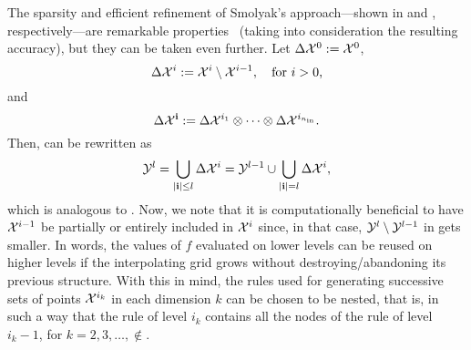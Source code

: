The sparsity and efficient refinement of Smolyak's approach---shown in
 and , respectively---are
remarkable properties \perse\ (taking into consideration the resulting
accuracy), but they can be taken even further. Let $\Delta \mathcal{X}^0 := \mathcal{X}^0$,
\[
  \Delta \mathcal{X}^i := \mathcal{X}^i \setminus \mathcal{X}^{i - 1}, \quad \text{for $i > 0$,}
\]
and
\[
  \Delta \mathcal{X}^{\mathbf{i}} := \Delta \mathcal{X}^{i_1} \otimes \cdots \otimes \Delta \mathcal{X}^{i_{n_\text{in}}}.
\]
Then,  can be rewritten as
\begin{equation} \elab{smolyak-grid-incremental}
  \Y^l = \bigcup_{|\vi| \leq l} \Delta \X^i = \Y^{l - 1} \cup \bigcup_{|\vi| = l} \Delta \X^i,
\end{equation}
which is analogous to . Now, we note that it is
computationally beneficial to have $\mathcal{X}^{i - 1}$ be partially or entirely
included in $\mathcal{X}^i$ since, in that case, $\mathcal{Y}^l \setminus \mathcal{Y}^{l - 1}$ in
 gets smaller. In words, the values of $f$
evaluated on lower levels can be reused on higher levels if the interpolating
grid grows without destroying/abandoning its previous structure. With this in
mind, the rules used for generating successive sets of points $\mathcal{X}^{i_k}$ in each
dimension $k$ can be chosen to be nested, that is, in such a way that the rule
of level $i_k$ contains all the nodes of the rule of level $i_k - 1$, for $k =
2, 3, \dots, \nin$.
